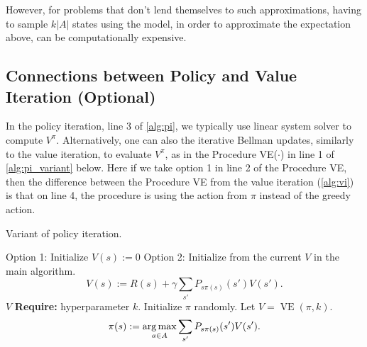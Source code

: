However, for problems that don't lend themselves to such approximations,
having to sample $k|A|$ states using the model, in order to approximate the
expectation above, can be computationally expensive.

\begin{fullwidth}    
\chapter{Connections between Policy and Value Iteration (Optional)}\label{sec:connections_pi_vi}
\end{fullwidth}
In the policy iteration, line 3 of \cref{alg:pi}, we typically use linear system
solver to compute $V^\pi$.
Alternatively, one can also the iterative Bellman
updates, similarly to the value iteration, to evaluate $V^\pi$, as in the Procedure
VE($\cdot$) in line 1 of \cref{alg:pi_variant} below. Here if we take option 1 in line 2 of
the Procedure VE, then the difference between the Procedure VE from the
value iteration (\cref{alg:vi}) is that on line 4, the procedure is using the
action from $\pi$ instead of the greedy action.

\begin{algorithm}[ht]
    \caption{Variant of policy iteration.}
    \label{alg:pi_variant}
    \begin{algorithmic}
     
        \State Option 1: Initialize $V(s) := 0$
        \State Option 2: Initialize from the current $V$ in the main algorithm.
                \State \begin{equation}\label{eq:pi_variant_value}
                    V(s) := R(s) + \gamma \sum_{s'} P_{s\pi(s)}(s')V(s').
                \end{equation}
            \EndFor
        \EndFor
        \State \Return $V$
    \EndFunction
    \State \textbf{Require:} hyperparameter $k$.
    \State Initialize $\pi$ randomly.
    \Repeat
        \State Let $V = \operatorname{VE}(\pi,k)$.
            \State \begin{equation}\label{eq:pi_variant_policy}
                \pi(s) := \argmax_{a \in A} \sum_{s'} P_{s\pi(s)}(s')V(s').
            \end{equation}            
        \EndFor
    \end{algorithmic}
\end{algorithm}

